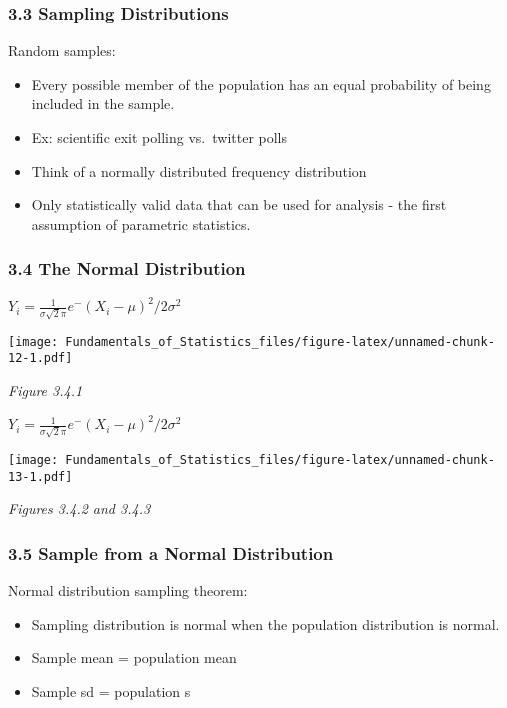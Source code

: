 \documentclass[]{article}
\providecommand{\tightlist}{%
  \setlength{\itemsep}{0pt}\setlength{\parskip}{0pt}}
\begin{document}
\hypertarget{sampling-distributions}{%
\subsubsection{3.3 Sampling
Distributions}\label{sampling-distributions}}

Random samples:

\begin{itemize}
\tightlist
\item
  Every possible member of the population has an equal probability of
  being included in the sample.
\item
  Ex: scientific exit polling vs.~twitter polls
\item
  Think of a normally distributed frequency distribution
\item
  Only statistically valid data that can be used for analysis - the
  first assumption of parametric statistics.
\end{itemize}

\hypertarget{the-normal-distribution}{%
\subsubsection{3.4 The Normal
Distribution}\label{the-normal-distribution}}

\(Y_i = \frac{1}{\sigma\sqrt2\pi}e^-(X_i-\mu)^2/2\sigma^2\)

\texttt{[image: Fundamentals\_of\_Statistics\_files/figure-latex/unnamed-chunk-12-1.pdf]}

\emph{Figure 3.4.1}

\(Y_i = \frac{1}{\sigma\sqrt2\pi}e^-(X_i-\mu)^2/2\sigma^2\)

\texttt{[image: Fundamentals\_of\_Statistics\_files/figure-latex/unnamed-chunk-13-1.pdf]}

\emph{Figures 3.4.2 and 3.4.3}

\hypertarget{sample-from-a-normal-distribution}{%
\subsubsection{3.5 Sample from a Normal
Distribution}\label{sample-from-a-normal-distribution}}

Normal distribution sampling theorem:

\begin{itemize}
\tightlist
\item
  Sampling distribution is normal when the population distribution is
  normal.
\item
  Sample mean = population mean
\item
  Sample sd = population s
\end{itemize}
\end{document}
